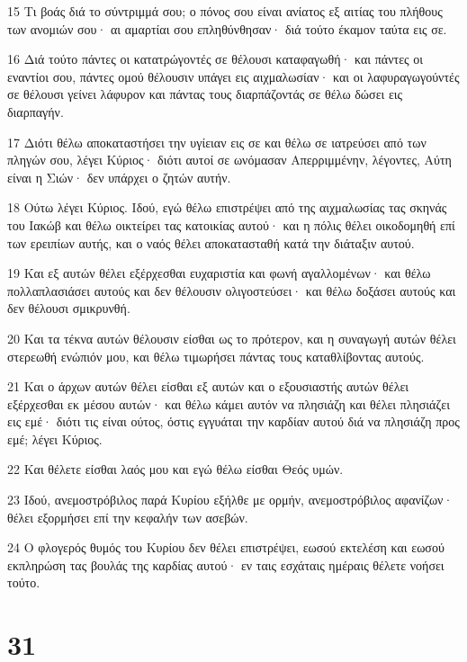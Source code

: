 \par 15 Τι βοάς διά το σύντριμμά σου; ο πόνος σου είναι ανίατος εξ αιτίας του πλήθους των ανομιών σου· αι αμαρτίαι σου επληθύνθησαν· διά τούτο έκαμον ταύτα εις σε.
\par 16 Διά τούτο πάντες οι κατατρώγοντές σε θέλουσι καταφαγωθή· και πάντες οι εναντίοι σου, πάντες ομού θέλουσιν υπάγει εις αιχμαλωσίαν· και οι λαφυραγωγούντές σε θέλουσι γείνει λάφυρον και πάντας τους διαρπάζοντάς σε θέλω δώσει εις διαρπαγήν.
\par 17 Διότι θέλω αποκαταστήσει την υγίειαν εις σε και θέλω σε ιατρεύσει από των πληγών σου, λέγει Κύριος· διότι αυτοί σε ωνόμασαν Απερριμμένην, λέγοντες, Αύτη είναι η Σιών· δεν υπάρχει ο ζητών αυτήν.
\par 18 Ούτω λέγει Κύριος. Ιδού, εγώ θέλω επιστρέψει από της αιχμαλωσίας τας σκηνάς του Ιακώβ και θέλω οικτείρει τας κατοικίας αυτού· και η πόλις θέλει οικοδομηθή επί των ερειπίων αυτής, και ο ναός θέλει αποκατασταθή κατά την διάταξιν αυτού.
\par 19 Και εξ αυτών θέλει εξέρχεσθαι ευχαριστία και φωνή αγαλλομένων· και θέλω πολλαπλασιάσει αυτούς και δεν θέλουσιν ολιγοστεύσει· και θέλω δοξάσει αυτούς και δεν θέλουσι σμικρυνθή.
\par 20 Και τα τέκνα αυτών θέλουσιν είσθαι ως το πρότερον, και η συναγωγή αυτών θέλει στερεωθή ενώπιόν μου, και θέλω τιμωρήσει πάντας τους καταθλίβοντας αυτούς.
\par 21 Και ο άρχων αυτών θέλει είσθαι εξ αυτών και ο εξουσιαστής αυτών θέλει εξέρχεσθαι εκ μέσου αυτών· και θέλω κάμει αυτόν να πλησιάζη και θέλει πλησιάζει εις εμέ· διότι τις είναι ούτος, όστις εγγυάται την καρδίαν αυτού διά να πλησιάζη προς εμέ; λέγει Κύριος.
\par 22 Και θέλετε είσθαι λαός μου και εγώ θέλω είσθαι Θεός υμών.
\par 23 Ιδού, ανεμοστρόβιλος παρά Κυρίου εξήλθε με ορμήν, ανεμοστρόβιλος αφανίζων· θέλει εξορμήσει επί την κεφαλήν των ασεβών.
\par 24 Ο φλογερός θυμός του Κυρίου δεν θέλει επιστρέψει, εωσού εκτελέση και εωσού εκπληρώση τας βουλάς της καρδίας αυτού· εν ταις εσχάταις ημέραις θέλετε νοήσει τούτο.

\chapter{31}


